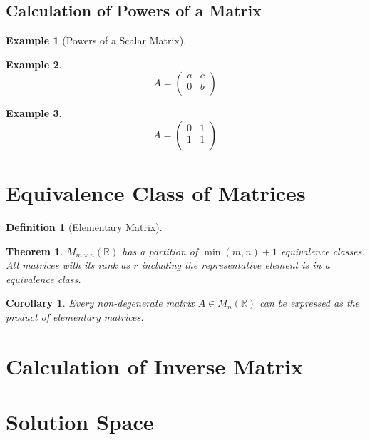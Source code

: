 \documentclass[onecolumn]{ctexart}
\newtheorem{definition}{Definition}
\newtheorem{theorem}{Theorem}
\newtheorem{corollary}{Corollary}
\newtheorem{example}{Example}
\begin{document}
\subsection{Calculation of Powers of a Matrix}

\begin{example}[Powers of a Scalar Matrix]
  
\end{example}

\begin{example}
  \[
    A = 
    \begin{pmatrix}
      a & c \\
      0 & b \\
    \end{pmatrix}
  \]
\end{example}

\begin{example}
  \[
    A = 
    \begin{pmatrix}
      0 & 1 \\
      1 & 1 \\
    \end{pmatrix}
  \]
\end{example}

\section{Equivalence Class of Matrices}

\begin{definition}[Elementary Matrix]
  
\end{definition}

\begin{theorem}
  $M_{m \times n}(\mathbb{R})$ has a partition of $\min(m, n) + 1$ equivalence 
  classes. All matrices with its rank as $r$ including the representative 
  element is in a equivalence class.
\end{theorem}

\begin{corollary}
  Every non-degenerate matrix $A \in M_n(\mathbb{R})$ can be expressed as the 
  product of elementary matrices.
\end{corollary}

\section{Calculation of Inverse Matrix}

\section{Solution Space}
\end{document}
